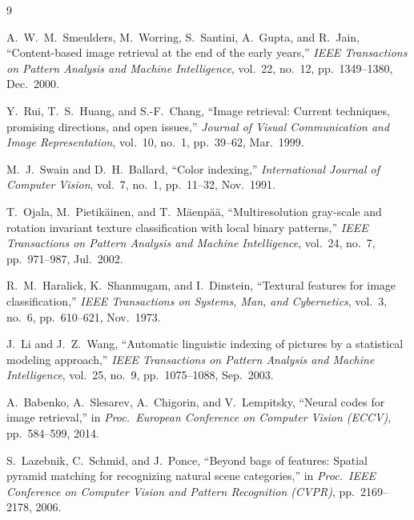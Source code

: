 \documentclass[12pt, a4paper]{article}
\begin{document}
\begin{thebibliography}{9}

A.~W.~M.~Smeulders, M.~Worring, S.~Santini, A.~Gupta, and R.~Jain,
``Content-based image retrieval at the end of the early years,''
\textit{IEEE Transactions on Pattern Analysis and Machine Intelligence},
vol.~22, no.~12, pp.~1349--1380, Dec.~2000.

Y.~Rui, T.~S.~Huang, and S.-F.~Chang,
``Image retrieval: Current techniques, promising directions, and open issues,''
\textit{Journal of Visual Communication and Image Representation},
vol.~10, no.~1, pp.~39--62, Mar.~1999.

M.~J.~Swain and D.~H.~Ballard,
``Color indexing,''
\textit{International Journal of Computer Vision},
vol.~7, no.~1, pp.~11--32, Nov.~1991.

T.~Ojala, M.~Pietik\"{a}inen, and T.~M\"{a}enp\"{a}\"{a},
``Multiresolution gray-scale and rotation invariant texture classification
with local binary patterns,''
\textit{IEEE Transactions on Pattern Analysis and Machine Intelligence},
vol.~24, no.~7, pp.~971--987, Jul.~2002.

R.~M.~Haralick, K.~Shanmugam, and I.~Dinstein,
``Textural features for image classification,''
\textit{IEEE Transactions on Systems, Man, and Cybernetics},
vol.~3, no.~6, pp.~610--621, Nov.~1973.

J.~Li and J.~Z.~Wang,
``Automatic linguistic indexing of pictures by a statistical modeling approach,''
\textit{IEEE Transactions on Pattern Analysis and Machine Intelligence},
vol.~25, no.~9, pp.~1075--1088, Sep.~2003.

A.~Babenko, A.~Slesarev, A.~Chigorin, and V.~Lempitsky,
``Neural codes for image retrieval,''
in \textit{Proc.\ European Conference on Computer Vision (ECCV)},
pp.~584--599, 2014.

S.~Lazebnik, C.~Schmid, and J.~Ponce,
``Beyond bags of features: Spatial pyramid matching for recognizing natural scene categories,''
in \textit{Proc.\ IEEE Conference on Computer Vision and Pattern Recognition (CVPR)},
pp.~2169--2178, 2006.

\end{thebibliography}
\end{document}
